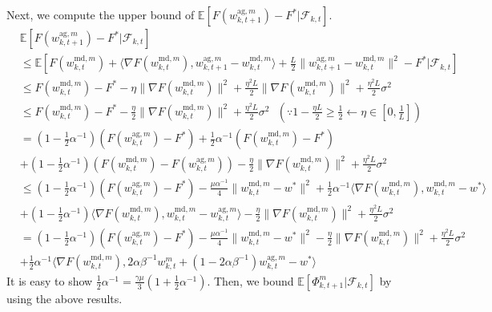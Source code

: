 \documentclass[11pt]{article}
\begin{document}
Next, we compute the upper bound of $\mathbb{E}[F(w_{k, t+1}^{\textrm{ag}, m}) - F^*|\mathcal{F}_{k, t}]$.
\begin{align*}
    &\mathbb{E}[F(w_{k, t+1}^{\textrm{ag}, m}) - F^*|\mathcal{F}_{k, t}] \\
    &\leq \mathbb{E}[F(w_{k, t}^{\textrm{md}, m}) + \langle \nabla F(w_{k, t}^{\textrm{md}, m}), w_{k, t+1}^{\textrm{ag}, m} - w_{k, t}^{\textrm{md}, m} \rangle + \frac{L}{2}\|w_{k, t+1}^{\textrm{ag}, m} - w_{k, t}^{\textrm{md}, m}\|^2 - F^*|\mathcal{F}_{k, t}] \\
    &\leq F(w_{k, t}^{\textrm{md}, m}) -F^* - \eta\|\nabla F(w_{k, t}^{\textrm{md}, m})\|^2 + \frac{\eta^2 L}{2}\|\nabla F(w_{k, t}^{\textrm{md}, m})\|^2 + \frac{\eta^2 L}{2}\sigma^2 \\
    &\leq F(w_{k, t}^{\textrm{md}, m}) -F^* - \frac{\eta}{2}\|\nabla F(w_{k, t}^{\textrm{md}, m})\|^2 + \frac{\eta^2 L}{2}\sigma^2 \textrm{ }(\because 1-\frac{\eta L}{2} \geq \frac{1}{2} \leftarrow \eta \in [0, \frac{1}{L}]) \\
    &= (1-\frac{1}{2}\alpha^{-1})(F(w_{k, t}^{\textrm{ag}, m})-F^*) + \frac{1}{2}\alpha^{-1}(F(w_{k, t}^{\textrm{md}, m}) -F^*) \\
    &+ (1-\frac{1}{2}\alpha^{-1})(F(w_{k, t}^{\textrm{md}, m}) - F(w_{k, t}^{\textrm{ag}, m})) - \frac{\eta}{2}\|\nabla F(w_{k, t}^{\textrm{md}, m})\|^2 + \frac{\eta^2 L}{2}\sigma^2 \\
    &\leq (1-\frac{1}{2}\alpha^{-1})(F(w_{k, t}^{\textrm{ag}, m})-F^*) - \frac{\mu\alpha^{-1}}{4}\|w_{k, t}^{\textrm{md}, m}-w^*\|^2 + \frac{1}{2}\alpha^{-1} \langle \nabla F(w_{k, t}^{\textrm{md}, m}), w_{k, t}^{\textrm{md}, m}-w^*\rangle \\
    &+ (1-\frac{1}{2}\alpha^{-1})\langle \nabla F(w_{k, t}^{\textrm{md}, m}), w_{k, t}^{\textrm{md}, m} - w_{k, t}^{\textrm{ag}, m}\rangle - \frac{\eta}{2}\|\nabla F(w_{k, t}^{\textrm{md}, m})\|^2 + \frac{\eta^2 L}{2}\sigma^2 \\
    &= (1-\frac{1}{2}\alpha^{-1})(F(w_{k, t}^{\textrm{ag}, m})-F^*) - \frac{\mu\alpha^{-1}}{4}\|w_{k, t}^{\textrm{md}, m}-w^*\|^2 - \frac{\eta}{2}\|\nabla F(w_{k, t}^{\textrm{md}, m})\|^2 + \frac{\eta^2 L}{2}\sigma^2 \\
    &+ \frac{1}{2}\alpha^{-1} \langle \nabla F(w_{k, t}^{\textrm{md}, m}), 2\alpha\beta^{-1}w_{k, t}^m + (1 - 2\alpha\beta^{-1})w_{k, t}^{\textrm{ag}, m} - w^*\rangle
\end{align*}
It is easy to show $\frac{1}{2}\alpha^{-1} = \frac{\gamma\mu}{3}(1+\frac{1}{2}\alpha^{-1})$. Then, we bound $\mathbb{E}[\Phi_{k, t+1}^m|\mathcal{F}_{k, t}]$ by using the above results.
\end{document}
